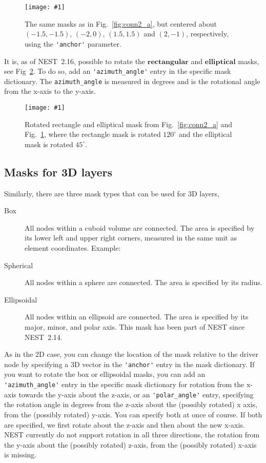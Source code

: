\documentclass[a4paper,12pt]{report}
\newcommand{\scriptfig}[4]{%
\begin{figure}
\centerline{\texttt{[image: \#1]}}
\caption[#3]{#4}
\label{fig:#1}
\end{figure}%
}
\begin{document}
\scriptfig{conn2_b}{0.9}{Masks for 2D layers}%
{The same masks as in Fig.~\ref{fig:conn2_a}, but
 centered about $(-1.5,-1.5)$, $(-2,0)$, $(1.5,1.5)$ and $(2, -1)$,
 respectively, using the \lstinline!'anchor'! parameter.}

\noindent It is, as of NEST~2.16, possible to rotate the $\textbf{rectangular}$
and $\textbf{elliptical}$ masks, see Fig~\ref{fig:conn2_c}. To do so, add an
\lstinline!'azimuth_angle'! entry in the
specific mask dictionary. The \lstinline!azimuth_angle! is measured in degrees
and is the rotational angle from the x-axis to the y-axis. 

\newpage


\scriptfig{conn2_c}{0.9}{Masks for 2D layers}%
{Rotated rectangle and elliptical mask from Fig.~\ref{fig:conn2_a} and
 Fig.~\ref{fig:conn2_b}, where the rectangle mask is rotated $120^\circ$ and
 the elliptical mask is rotated $45^\circ$.}

\subsection{Masks for 3D layers}\label{sec:3d_masks}

Similarly, there are three mask types that can be used for 3D layers,
\begin{description}
\item[Box] All nodes within a cuboid volume are connected. The
  area is specified by its lower left and upper right corners, measured in
  the same unit as element coordinates. Example:
  
\item[Spherical] All nodes within a sphere are
  connected.  The area is specified by its radius.

\item[Ellipsoidal] All nodes within an ellipsoid are
  connected. The area is specified by its major, minor, and polar axis. This
  mask has been part of NEST since NEST~2.14.

\end{description}
As in the 2D case, you can change the location of the mask relative to the
driver node by specifying a 3D vector in the \lstinline!'anchor'!
entry in the mask dictionary. If you want to rotate the box or ellipsoidal
masks, you can add an \lstinline!'azimuth_angle'! entry
in the specific mask dictionary for rotation from the x-axis towards the y-axis
about the z-axis, or an \lstinline!'polar_angle'! entry,
specifying the rotation angle in degrees from the z-axis about the (possibly
rotated) x axis, from the (possibly rotated) y-axis. You can specify both at
once of course. If both are specified, we first rotate about the z-axis and
then about the new x-axis. NEST currently do not support rotation in all three
directions, the rotation from the y-axis about the (possibly rotated) z-axis,
from the (possibly rotated) x-axis is missing.
\end{document}
